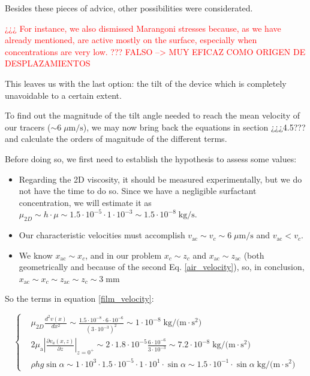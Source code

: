 Besides these pieces of advice, other possibilities were considerated.

\textcolor{red}{¿¿¿ For instance, we also dismissed Marangoni stresses because, as we have already mentioned, are active mostly on the surface, especially when concentrations are very low. ??? FALSO --> MUY EFICAZ COMO ORIGEN DE DESPLAZAMIENTOS}

This leaves us with the last option: the tilt of the device which is completely unavoidable to a certain extent.

To find out the magnitude of the tilt angle needed to reach the mean velocity of our tracers ($\sim 6 \; \mu \textrm{m/s}$), we may now bring back the equations in section ¿¿¿4.5??? and calculate the orders of magnitude of the different terms. 

Before doing so, we first need to establish the hypothesis to assess some values:

\begin{itemize}
	\item Regarding the 2D viscosity, it should be measured experimentally, but we do not have the time to do so. Since we have a negligible surfactant concentration, we will estimate it as $\mu_{2D} \sim h \cdot \mu \sim 1.5\cdot 10^{-5} \cdot 1\cdot 10^{-3} \sim 1.5\cdot 10^{-8} \; \textrm{kg/s}$.
	\item Our characteristic velocities must accomplish $ v_{\mathrm{ac}} \sim v_c \sim 6 \; \mu \textrm{m/s}$ and $ v_{\mathrm{ac}} < v_c $.
	\item We know $x_{\mathrm{ac}} \sim x_c$, and in our problem $ x_c \sim z_c $ and $ x_{\mathrm{ac}} \sim z_{\mathrm{ac}} $ (both geometrically and because of the second Eq. \ref{air_velocity}), so, in conclusion, $ x_{\mathrm{ac}} \sim x_c \sim z_{\mathrm{ac}} \sim z_c \sim 3 \; \textrm{mm}$
	
\end{itemize}

So the terms in equation \ref{film_velocity}:

\begin{equation}
\left\{
\begin{aligned}
& \mu_{2D} \frac{d^{2} v(x)}{d x^{2}} \sim \frac{1.5\cdot 10^{-8} \cdot 6\cdot 10^{-6}}{(3\cdot 10^{-3})^2} \sim 1\cdot 10^{-8} \; \textrm{kg/(m} \cdot \textrm{s}^\textrm{2} \textrm{)}\\
& 2 \mu_{\mathrm{a}}\left|\frac{\partial v_{a}(x, z)}{\partial z}\right|_{z=0^{+}} \sim 2 \cdot 1.8\cdot 10^{-5} \frac{6\cdot 10^{-6}}{3\cdot 10^{-3}} \sim 7.2\cdot 10^{-8} \; \textrm{kg/(m} \cdot \textrm{s}^\textrm{2} \textrm{)}\\
& \rho h g \sin \alpha \sim 1\cdot 10^{3} \cdot 1.5\cdot 10^{-5} \cdot 1\cdot 10^{1} \cdot \sin \alpha \sim 1.5\cdot 10^{-1} \cdot \sin \alpha \; \textrm{kg/(m} \cdot \textrm{s}^\textrm{2} \textrm{)} 
\end{aligned}
\right.
\end{equation}


